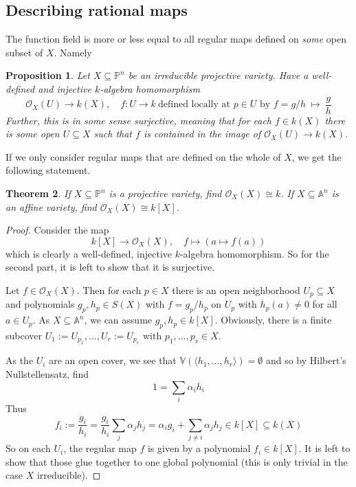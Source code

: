 \documentclass{scrartcl}
\newcommand{\V}{\mathbb{V}}
\newcommand{\Aff}{\mathbb{A}}
\newcommand{\Proj}{\mathbb{P}}
\newtheorem{prop}{Proposition}[section]
\newtheorem{theorem}[prop]{Theorem}
\theoremstyle{definition}
\begin{document}
\subsection{Describing rational maps}
The function field is more or less equal to all regular maps defined on \emph{some} open subset of $X$. Namely
\begin{prop}
    Let $X \subseteq \Proj^n$ be an irreducible projective variety.
    Have a well-defined and injective $k$-algebra homomorphism
    \begin{equation*}
        \mathcal{O}_X(U) \to k(X), \quad f: U \to k \ \text{defined locally at $p \in U$ by $f = g/h$} \ \mapsto \ \frac g h
    \end{equation*}
    Further, this is in some sense surjective, meaning that for each $f \in k(X)$ there is some open $U \subseteq X$ such that $f$ is contained in the image of $\mathcal{O}_X(U) \to k(X)$.
\end{prop}
If we only consider regular maps that are defined on the whole of $X$, we get the following statement.
\begin{theorem}
    If $X \subseteq \Proj^n$ is a projective variety, find $\mathcal{O}_X(X) \cong k$.
    If $X \subseteq \Aff^n$ is an affine variety, find $\mathcal{O}_X(X) \cong k[X]$.
\end{theorem}
\begin{proof}
    Consider the map
    \begin{equation*}
        k[X] \to \mathcal{O}_X(X), \quad f \mapsto (a \mapsto f(a))
    \end{equation*}
    which is clearly a well-defined, injective $k$-algebra homomorphism.
    So for the second part, it is left to show that it is surjective.

    Let $f \in \mathcal{O}_X(X)$.
    Then for each $p \in X$ there is an open neighborhood $U_p \subseteq X$ and polynomials $g_p, h_p \in S(X)$ with $f = g_p/h_p$ on $U_p$ with $h_p(a) \neq 0$ for all $a \in U_p$.
    As $X \subseteq \Aff^n$, we can assume $g_p, h_p \in k[X]$.
    Obviously, there is a finite subcover $U_1 := U_{p_1}, ..., U_r := U_{p_r}$ with $p_1, ..., p_r \in X$.

    As the $U_i$ are an open cover, we see that $\V(\langle h_1, ..., h_r \rangle) = \emptyset$ and so by Hilbert's Nullstellensatz, find
    \begin{equation*}
        1 = \sum_i \alpha_i h_i
    \end{equation*}
    Thus
    \begin{equation*}
        f_i := \frac {g_i} {h_i} = \frac {g_i} {h_i} \sum_j \alpha_j h_j = \alpha_i g_i + \sum_{j \neq i} \alpha_j h_j \in k[X] \subseteq k(X)
    \end{equation*}
    So on each $U_i$, the regular map $f$ is given by a polynomial $f_i \in k[X]$.
    It is left to show that those glue together to one global polynomial (this is only trivial in the case $X$ irreducible).
\end{proof}
\end{document}
